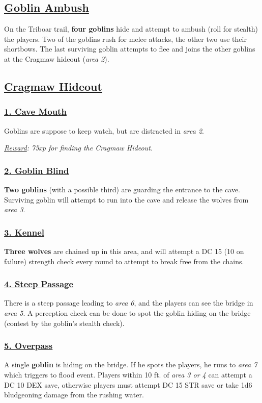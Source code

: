 \subsection*{\underline{Goblin Ambush}}
On the Triboar trail, \textbf{four goblins} hide and attempt to ambush (roll for stealth) the players. Two of the goblins rush for melee attacks, the other two use their shortbows. The last surviving goblin attempts to flee and joins the other goblins at the Cragmaw hideout (\emph{area 2}).

\subsection*{\underline{Cragmaw Hideout}}
\subsubsection*{\underline{1. Cave Mouth}}
Goblins are suppose to keep watch, but are distracted in \emph{area 2}.

\emph{\underline{Reward}: 75xp for finding the Cragmaw Hideout.}

\subsubsection*{\underline{2. Goblin Blind}}
\textbf{Two goblins} (with a possible third) are guarding the entrance to the cave. Surviving goblin will attempt to run into the cave and release the wolves from \emph{area 3}.

\subsubsection*{\underline{3. Kennel}}
\textbf{Three wolves} are chained up in this area, and will attempt a DC 15 (10 on failure) strength check every round to attempt to break free from the chains.

\subsubsection*{\underline{4. Steep Passage}}
There is a steep passage leading to \emph{area 6}, and the players can see the bridge in \emph{area 5}. A perception check can be done to spot the goblin hiding on the bridge (contest by the goblin's stealth check).

\subsubsection*{\underline{5. Overpass}}
A single \textbf{goblin} is hiding on the bridge. If he spots the players, he runs to \emph{area 7} which triggers to flood event. Players within 10 ft. of \emph{area 3 or 4} can attempt a DC 10 DEX save, otherwise players must attempt DC 15 STR save or take 1d6 bludgeoning damage from the rushing water.


